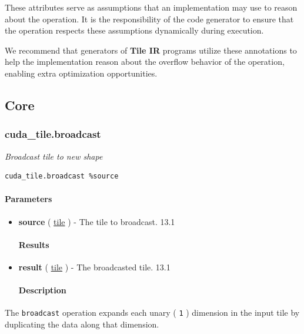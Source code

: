 \documentclass{article}
\begin{document}
These attributes serve as assumptions that an implementation may use to reason about the operation. It is the responsibility of the code generator to ensure that the operation respects these assumptions dynamically during execution.


We recommend that generators of \textbf{Tile IR} programs utilize these annotations to help the implementation reason about the overflow behavior of the operation, enabling extra optimization opportunities.



\subsection{Core}

\subsubsection{cuda\_tile.broadcast}

\textit{Broadcast tile to new shape}


\begin{lstlisting}
cuda_tile.broadcast %source
\end{lstlisting}

\paragraph{Parameters}

\begin{itemize}
\item \textbf{source} ( \href{https://docs.nvidia.com/cuda/tile-ir/latest/sections/types.html#type-tile}{tile} ) - The tile to broadcast. 13.1


\paragraph{Results}

\item \textbf{result} ( \href{https://docs.nvidia.com/cuda/tile-ir/latest/sections/types.html#type-tile}{tile} ) - The broadcasted tile. 13.1


\paragraph{Description}

\end{itemize}
The \texttt{broadcast} operation expands each unary ( \texttt{1} ) dimension in the input tile by duplicating the data along that dimension.
\end{document}
